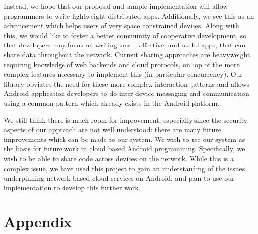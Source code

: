 \documentclass{acm_proc_article-sp}
\begin{document}
Instead, we hope that our proposal and sample implementation will
allow programmers to write lightweight distributed apps.
Additionally, we see this as an advancement which helps users of very
space constrained devices.  Along with this, we would like to foster a
better community of cooperative development, so that developers may
focus on writing small, effective, and useful apps, that can share
data throughout the network.  Current sharing approaches are
heavyweight, requiring knowledge of web backends and cloud protocols,
on top of the more complex features necessary to implement this (in
particular concurrency).  Our library obviates the need for these more
complex interaction patterns and allows Android application developers
to do inter device messaging and communication using a common pattern
which already exists in the Android platform.

We still think there is much room for improvement, especially since
the security aspects of our approach are not well understood: there
are many future improvements which can be made to our system.  We wish
to use our system as the basis for future work in cloud based Android
programming.  Specifically, we wish to be able to share code across
devices on the network.  While this is a complex issue, we have used
this project to gain an understanding of the issues underpinning
network based cloud services on Android, and plan to use our
implementation to develop this further work.

\nocite{*}




\section{Appendix}
\end{document}
